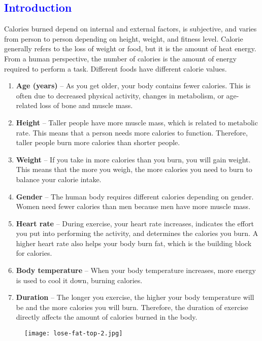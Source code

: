 \documentclass[conference]{IEEEtran}
\newcommand{\mar}[1]{\textcolor{blue}{#1}}
\begin{document}
\mar{\section{\textbf{\large Introduction }}} 
\label{sec:intro}
Calories burned depend on internal and external factors, is subjective, and varies from person to person depending on height, weight, and fitness level. Calorie generally refers to the loss of weight or food, but it is the amount of heat energy. From a human perspective, the number of calories is the amount of energy required to perform a task. Different foods have different calorie values. 
\begin{enumerate}
\item \textbf{Age (years)} – As you get older, your body contains fewer calories. This is often due to decreased physical activity, changes in metabolism, or age-related loss of bone and muscle mass. 

\item \textbf{Height} – Taller people have more muscle mass, which is related to metabolic rate. This means that a person needs more calories to function. Therefore, taller people burn more calories than shorter people. 

\item \textbf{Weight} – If you take in more calories than you burn, you will gain weight. This means that the more you weigh, the more calories you need to burn to balance your calorie intake. 

\item \textbf{Gender} – The human body requires different calories depending on gender. Women need fewer calories than men because men have more muscle mass. 

\item \textbf{Heart rate} – During exercise, your heart rate increases, indicates the effort you put into performing the activity, and determines the calories you burn. A higher heart rate also helps your body burn fat, which is the building block for calories. 

\item \textbf{Body temperature} – When your body temperature increases, more energy is used to cool it down, burning calories. 

\item \textbf{Duration} – The longer you exercise, the higher your body temperature will be and the more calories you will burn. Therefore, the duration of exercise directly affects the amount of calories burned in the body. \newline

\end{enumerate}
\begin{figure}[H]
\texttt{[image: lose-fat-top-2.jpg]}
\end{figure}
\end{document}
